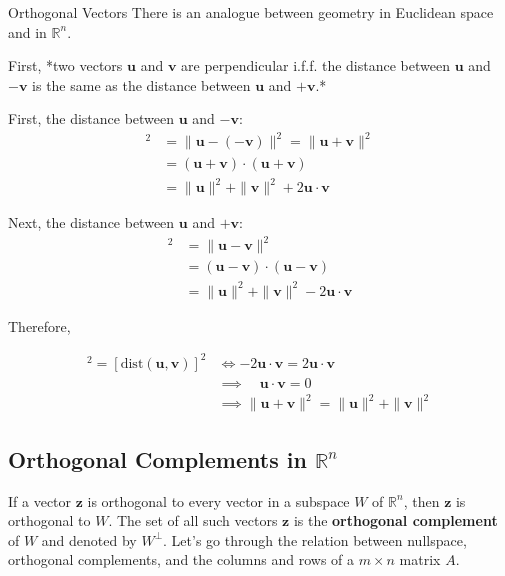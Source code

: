 \documentclass[]{article}
\begin{document}
 Orthogonal Vectors 
There is an analogue between geometry in Euclidean space and in $\mathds{R}^n$. 

First, *two vectors $\mathbf{u}$ and $\mathbf{v}$ are perpendicular i.f.f. the distance between $\mathbf{u}$ and $\mathbf{-v}$ is the same as the distance between $\mathbf{u}$ and $\mathbf{+v}$.* 

First, the distance between $\mathbf{u}$ and $\mathbf{-v}$:
\begin{align}
[\textrm{dist}(\mathbf{u}, \mathbf{-v})]^2 &= \parallel \mathbf{u}-(-\mathbf{v}) \parallel ^2 = \parallel \mathbf{u} +\mathbf{v} \parallel ^2 \\
&= (\mathbf{u} + \mathbf{v}) \cdot (\mathbf{u} + \mathbf{v}) \\ 
&= \parallel \mathbf{u} \parallel^2 + \parallel \mathbf{v} \parallel^2 + 2\mathbf{u} \cdot \mathbf{v}
\end{align}

Next, the distance between $\mathbf{u}$ and $\mathbf{+v}$:
\begin{align}
[\textrm{dist}(\mathbf{u}, \mathbf{v})]^2 &= \parallel \mathbf{u} -\mathbf{v} \parallel ^2 \\
&= (\mathbf{u} - \mathbf{v}) \cdot (\mathbf{u} - \mathbf{v}) \\ 
&= \parallel \mathbf{u} \parallel^2 + \parallel \mathbf{v} \parallel^2 - 2\mathbf{u} \cdot \mathbf{v}
\end{align}

Therefore, 

\begin{align}
	[\textrm{dist}(\mathbf{u}, \mathbf{-v})]^2 = [\textrm{dist}(\mathbf{u}, \mathbf{v})]^2 &\iff - 2\mathbf{u} \cdot \mathbf{v} = 2\mathbf{u} \cdot \mathbf{v} \\
	&\implies \quad \mathbf{u} \cdot \mathbf{v} = 0 \\
	&\implies \parallel \mathbf{u} + \mathbf{v} \parallel ^2 = \parallel \mathbf{u} \parallel^2 + \parallel \mathbf{v} \parallel^2
\end{align}

\subsection{Orthogonal Complements in $\mathds{R}^n$}
If a vector $\mathbf{z}$ is orthogonal to every vector in a subspace $W$ of $\mathds{R}^n$, then $\mathbf{z}$ is orthogonal to $W$. The set of all such vectors $\mathbf{z}$ is the \textbf{orthogonal complement} of $W$ and denoted by $W^\bot$. Let's go through the relation between nullspace, orthogonal complements, and the columns and rows of a $m \times n$ matrix $A$. 
\end{document}
